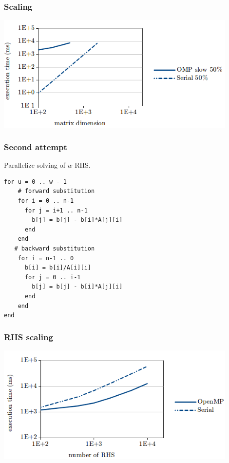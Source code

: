 \documentclass{beamer}
\begin{document}
\begin{frame}
\frametitle{Scaling}


\centerline{\includegraphics[width=12cm]{slow.png}}

\end{frame}

\begin{frame}[fragile]
\frametitle{Second attempt}
Parallelize solving of $w$ RHS.
\begin{lstlisting}
for u = 0 .. w - 1
    # forward substitution
    for i = 0 .. n-1
      for j = i+1 .. n-1
        b[j] = b[j] - b[i]*A[j][i]
      end
    end
   # backward substitution
    for i = n-1 .. 0
      b[i] = b[i]/A[i][i]
      for j = 0 .. i-1
        b[j] = b[j] - b[i]*A[j][i]
      end
    end
end
\end{lstlisting}
\end{frame}
\begin{frame}
\frametitle{RHS scaling}
\centerline{\includegraphics[width=12cm]{omp_rhs.png}}
\end{frame}
\end{document}
